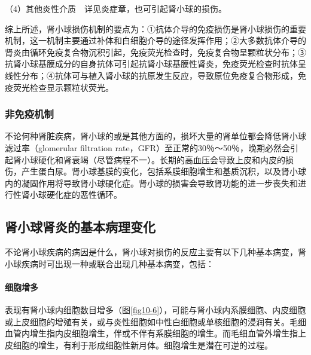 （4）其他炎性介质　详见炎症章，也可引起肾小球的损伤。

综上所述，肾小球损伤机制的要点为：①抗体介导的免疫损伤是肾小球损伤的重要机制，这一机制主要通过补体和白细胞介导的途径发挥作用；②大多数抗体介导的肾炎由循环免疫复合物沉积引起，免疫荧光检查时，免疫复合物呈颗粒状分布；③抗肾小球基膜成分的自身抗体可引起抗肾小球基膜性肾炎，免疫荧光检查时抗体呈线性分布；④抗体可与植入肾小球的抗原发生反应，导致原位免疫复合物形成，免疫荧光检查显示颗粒状荧光。

\subsubsection{非免疫机制}

不论何种肾脏疾病，肾小球的或是其他方面的，损坏大量的肾单位都会降低肾小球滤过率（glomerular
filtration
rate，GFR）至正常的30％～50％，晚期必然会引起肾小球硬化和肾衰竭（尽管病程不一）。长期的高血压会导致上皮和内皮的损伤，产生蛋白尿。肾小球基膜的变化，包括系膜细胞增生和基质沉积，以及肾小球内的凝固作用将导致肾小球硬化症。肾小球的损害会导致肾功能的进一步丧失和进行性肾小球硬化症的恶性循环。

\subsection{肾小球肾炎的基本病理变化}

不论肾小球疾病的病因是什么，肾小球对损伤的反应主要有以下几种基本病变，肾小球疾病时可出现一种或联合出现几种基本病变，包括：

\paragraph{细胞增多}
表现有肾小球内细胞数目增多（图\ref{fig10-6}），可能与肾小球内系膜细胞、内皮细胞或上皮细胞的增殖有关，或与炎性细胞如中性白细胞或单核细胞的浸润有关。毛细血管内增生指内皮细胞增生，伴或不伴有系膜细胞的增生。而毛细血管外增生指上皮细胞的增生，有利于形成细胞性新月体。细胞增生是潜在可逆的过程。

